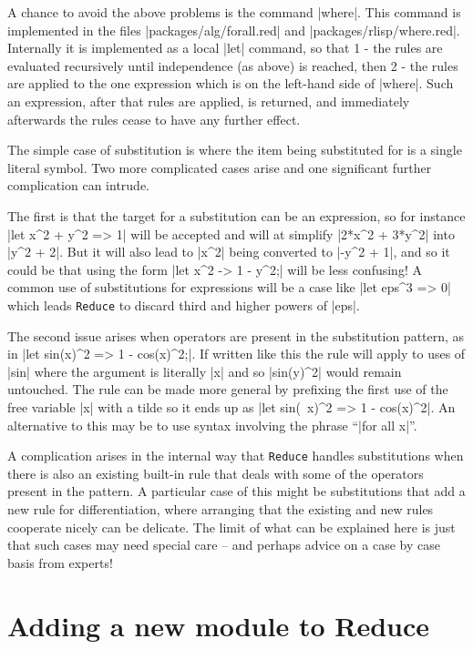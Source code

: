 \documentclass[12pt,twoside,openright]{memoir}
\newcommand{\reduce}{\texttt{Reduce}\xspace}
\begin{document}
A chance to avoid the above problems is the command |where|. This command is
implemented in the files |packages/alg/forall.red| and
|packages/rlisp/where.red|. Internally it is implemented as a local |let|
command, so that 1 - the rules are evaluated recursively until independence (as
above) is reached, then 2 - the rules are applied to the one expression which
is on the left-hand side of |where|. Such an expression, after that rules are
applied, is returned, and immediately afterwards the rules cease to have any
further effect.

The simple case of substitution is where the item being substituted for is
a single literal symbol. Two more complicated cases arise and one significant
further complication can intrude.

The first is that the target for a substitution can be an expression, so for
instance |let x^2 + y^2 => 1| will be accepted and will at simplify
|2*x^2 + 3*y^2| into |y^2 + 2|. But it will also lead to |x^2| being
converted to |-y^2 + 1|, and so it could be that using the form
|let x^2 -> 1 - y^2;| will be less confusing! A common use of substitutions
for expressions will be a case like |let eps^3 => 0| which leads \reduce
to discard third and higher powers of |eps|.

The second issue arises when operators are present in the substitution
pattern, as in |let sin(x)^2 => 1 - cos(x)^2;|. If written like this the
rule will apply to uses of |sin| where the argument is literally |x| and
so |sin(y)^2| would remain untouched. The rule can be made more general
by prefixing the first use of the free variable |x| with a tilde so it
ends up as |let sin(~x)^2 => 1 - cos(x)^2|. An alternative to this may be
to use syntax involving the phrase ``|for all x|''.

A complication arises in the internal way that \reduce handles
substitutions when there is also an existing built-in rule that deals with
some of the operators present in the pattern. A particular case of this
might be substitutions that add a new rule for differentiation, where arranging
that the existing and new rules cooperate nicely can be delicate. The
limit of what can be explained here is just that such cases may need
special care -- and perhaps advice on a case by case basis from experts!


\section{Adding a new module to Reduce}
\end{document}
